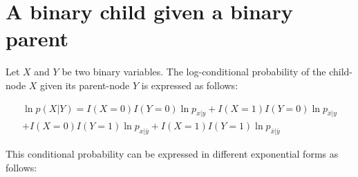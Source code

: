 \documentclass[11pt, oneside]{article}   	%
\numberwithin{figure}{section}
\numberwithin{equation}{section}
\numberwithin{table}{section}
\begin{document}
\section{A binary child given a binary parent}

Let $X$ and $Y$ be two binary variables. The log-conditional probability of the child-node $X$ given its parent-node $Y$ is expressed as follows:

\begin{eqnarray*}
\ln p(X|Y) =  I(X=0) I(Y=0) \ln p_{x|y} + I(X=1) I(Y=0) \ln p_{\bar{x}|y} \\
+ I(X=0) I(Y=1) \ln p_{x|\bar{y}} + I(X=1) I(Y=1) \ln p_{\bar{x}|\bar{y}}
\end{eqnarray*}

This conditional probability can be expressed in different exponential forms as follows:
\end{document}
